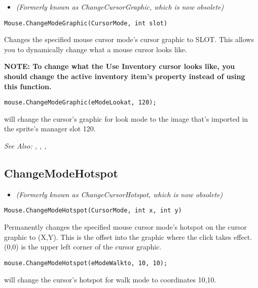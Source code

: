 \begin{itemize}
\item \it{(Formerly known as ChangeCursorGraphic, which is now obsolete)}
\end{itemize}

\begin{verbatim}
Mouse.ChangeModeGraphic(CursorMode, int slot)
\end{verbatim}
Changes the specified mouse cursor mode's cursor graphic to SLOT.
This allows you to dynamically change what a mouse cursor looks like.

\bf{NOTE:} To change what the Use Inventory cursor looks like, you should change
the active inventory item's  property
instead of using this function.

\begin{verbatim}
mouse.ChangeModeGraphic(eModeLookat, 120);
\end{verbatim}
will change the cursor's graphic for look mode to the image that's imported in the sprite's manager slot 120.

\it{See Also:} ,
,
,


\subsection{ChangeModeHotspot}\label{Mouse.ChangeModeHotspot}%

\begin{itemize}
\item \it{(Formerly known as ChangeCursorHotspot, which is now obsolete)}
\end{itemize}

\begin{verbatim}
Mouse.ChangeModeHotspot(CursorMode, int x, int y)
\end{verbatim}
Permanently changes the specified mouse cursor mode's hotspot on the cursor graphic
to (X,Y). This is the offset into the graphic where the click takes effect.
(0,0) is the upper left corner of the cursor graphic.

\begin{verbatim}
mouse.ChangeModeHotspot(eModeWalkto, 10, 10);
\end{verbatim}
will change the cursor's hotspot for walk mode to coordinates 10,10.

